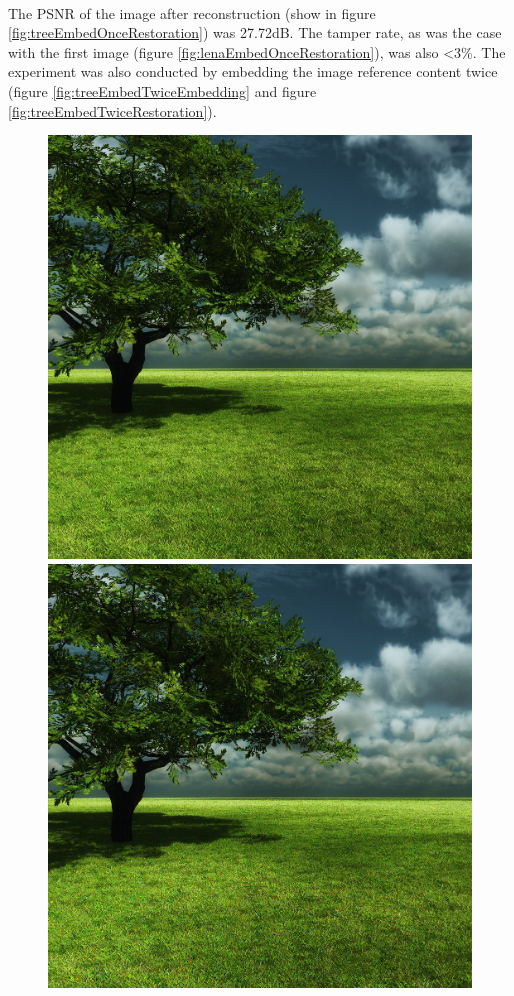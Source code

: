 \documentclass[12pt]{article}
\begin{document}
\hspace{0pt} \\
The PSNR of the image after reconstruction (show in figure \ref{fig:treeEmbedOnceRestoration}) was 27.72dB.
The tamper rate, as was the case with the first image (figure \ref{fig:lenaEmbedOnceRestoration}), was also \textless 3\%.
The experiment was also conducted by embedding the image reference content twice (figure \ref{fig:treeEmbedTwiceEmbedding} and figure \ref{fig:treeEmbedTwiceRestoration}).

\begin{figure}[h]
\centerline{%
\includegraphics[scale=0.3375]{"tree"}%
\hspace{0.1cm}
\includegraphics[scale=0.45]{"Tree Embed twice 0.8 threshold/finalImage"}%
}
\end{figure}
\end{document}
